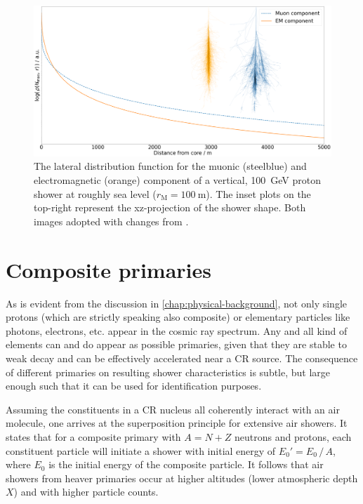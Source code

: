\begin{figure}
	\centering
	\includegraphics[width=1.0\textwidth]{./plots/componentwise_LDF.png}
	\caption{The lateral distribution function for the muonic (steelblue) and electromagnetic (orange) component of a vertical, \SI{100}{\giga\electronvolt}
	proton shower at roughly sea level ($r_\text{M}=\SI{100}{\meter}$). The inset plots on the top-right represent the xz-projection of the shower shape. Both 
	images adopted with changes from \cite{CorsikaShower}.}
	\label{fig:component-LDF}
\end{figure}

\section{Composite primaries}
\label{sec:superposition-principle}

As is evident from the discussion in \autoref{chap:physical-background}, not only single protons (which are strictly speaking also composite) or elementary 
particles like photons, electrons, etc. appear in the cosmic ray spectrum. Any and all kind of elements can and do appear as possible primaries, given that they
are stable to weak decay and can be effectively accelerated near a CR source. The consequence of different primaries on resulting shower characteristics is subtle,
but large enough such that it can be used for identification purposes.

Assuming the constituents in a CR nucleus all coherently interact with an air molecule, one arrives at the superposition principle for extensive air showers. It 
states that for a composite primary with $A = N + Z$ neutrons and protons, each constituent particle will initiate a shower with initial energy of 
$E_0' = E_0\,/\,A$, where $E_0$ is the initial energy of the composite particle. It follows that air showers from heaver primaries occur at higher altitudes (lower 
atmospheric depth $X$) and with higher particle counts.

